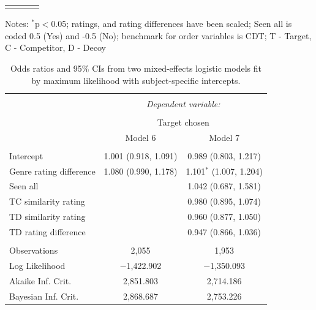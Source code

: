 \documentclass[12pt, a4paper]{article}
\begin{document}
\begin{appendices}
\begin{table}[htb!]
\begin{threeparttable}
\begin{tabular}{@{\extracolsep{5pt}}lccc}
\hline 
\hline \\[-1.8ex] 
\end{tabular} 
    \begin{tablenotes}
      \small
      \item Notes: $^{*}$p$<$0.05; ratings, and rating differences have been scaled; Seen all is coded 0.5 (Yes) and -0.5 (No); benchmark for order variables is CDT; T - Target, C - Competitor, D - Decoy
    \end{tablenotes}
  \end{threeparttable}
\end{table}


\begin{table}[htb!]
\centering
  \begin{threeparttable}
    \caption{Odds ratios and 95\% CIs from two mixed-effects logistic models fit by maximum likelihood with subject-specific intercepts.}
  \label{latentattr_exp3reg}
\begin{tabular}{@{\extracolsep{5pt}}lcc} 
\\[-1.8ex]\hline 
\hline \\[-1.8ex] 
 & \multicolumn{2}{c}{\textit{Dependent variable:}} \\ 
\cline{2-3} 
\\[-1.8ex] & \multicolumn{2}{c}{Target chosen} \\ 
 & Model 6 & Model 7 \\ 
\hline \\[-1.8ex] 
Intercept & 1.001 (0.918, 1.091) & 0.989 (0.803, 1.217) \\ 
 Genre rating difference & 1.080 (0.990, 1.178) & 1.101$^{*}$ (1.007, 1.204) \\  
 Seen all &  & 1.042 (0.687, 1.581) \\ 
  TC similarity rating &  & 0.980 (0.895, 1.074) \\ 
  TD similarity rating &  & 0.960 (0.877, 1.050) \\ 
  TD rating difference &  & 0.947 (0.866, 1.036) \\ 
   \hline \\[-1.8ex]
Observations & 2,055 & 1,953 \\ 
Log Likelihood & $-$1,422.902 & $-$1,350.093 \\ 
Akaike Inf. Crit. & 2,851.803 & 2,714.186 \\ 
Bayesian Inf. Crit. & 2,868.687 & 2,753.226 \\ 

\end{tabular}
\end{threeparttable}
\end{table}
\end{appendices}
\end{document}
